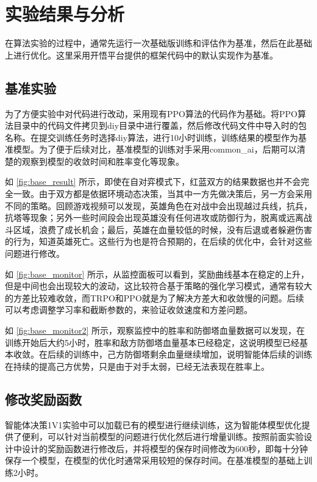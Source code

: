 \section{实验结果与分析}
在算法实验的过程中，通常先运行一次基础版训练和评估作为基准，然后在此基础上进行优化。这里采用开悟平台提供的框架代码中的默认实现作为基准。
\subsection{基准实验}
为了方便实验中对代码进行改动，采用现有PPO算法的代码作为基础。将PPO算法目录中的代码文件拷贝到diy目录中进行覆盖，然后修改代码文件中导入时的包名称。在提交训练任务时选择diy算法，进行10小时训练，训练结果的模型作为基准模型。为了便于后续对比，基准模型的训练对手采用common\_ai，后期可以清楚的观察到模型的收敛时间和胜率变化等现象。

如 \cref{fig:base_result} 所示，即使在自对弈模式下，红蓝双方的结果数据也并不会完全一致。由于双方都是依据环境动态决策，当其中一方先做决策后，另一方会采用不同的策略。回顾游戏视频可以发现，英雄角色在对战中会出现越过兵线，抗兵，抗塔等现象；另外一些时间段会出现英雄没有任何进攻或防御行为，脱离或远离战斗区域，浪费了成长机会；最后，英雄在血量较低的时候，没有后退或者躲避伤害的行为，知道英雄死亡。这些行为也是符合预期的，在后续的优化中，会针对这些问题进行修改。

如 \cref{fig:base_monitor} 所示，从监控面板可以看到，奖励曲线基本在稳定的上升，但是中间也会出现较大的波动，这比较符合基于策略的强化学习模式，通常有较大的方差比较难收敛，而TRPO和PPO就是为了解决方差大和收敛慢的问题。后续可以考虑调整学习率和截断参数的，来验证收敛速度和方差问题。

如 \cref{fig:base_monitor2} 所示，观察监控中的胜率和防御塔血量数据可以发现，在训练开始后大约5小时，胜率和敌方防御塔血量基本已经稳定，这说明模型已经基本收敛。在后续的训练中，己方防御塔剩余血量继续增加，说明智能体后续的训练在持续的提高己方优势，只是由于对手太弱，已经无法表现在胜率上。

\subsection{修改奖励函数}
智能体决策1V1实验中可以加载已有的模型进行继续训练，这为智能体模型优化提供了便利，可以针对当前模型的问题进行优化然后进行增量训练。按照前面实验设计中设计的奖励函数进行修改后，并将模型的保存时间修改为600秒，即每十分钟保存一个模型，在模型的优化时通常采用较短的保存时间。在基准模型的基础上训练2小时。

